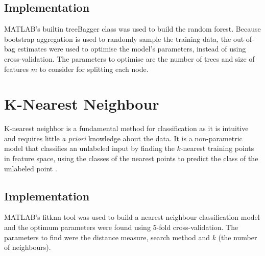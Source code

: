 \subsection{Implementation}

MATLAB's builtin treeBagger class was used to build the random forest. Because bootstrap aggregation is used to randomly sample the training data, the out-of-bag estimates were used to optimise the model's parameters, instead of using cross-validation. The parameters to optimise are the number of trees and size of features $m$ to consider for splitting each node. 

\section{K-Nearest Neighbour}

K-nearest neighbor is a fundamental method for classification as it is intuitive and requires little \textit{a priori} knowledge about the data. It is a non-parametric model that classifies an unlabeled input by finding the $k$-nearest training points in feature space, using the classes of the nearest points to predict the class of the unlabeled point \cite{Peterson}. 

\subsection{Implementation}

MATLAB's fitknn tool was used to build a nearest neighbour classification model and the optimum parameters were found using 5-fold cross-validation. The parameters to find were the distance measure, search method and $k$ (the number of neighbours). 


